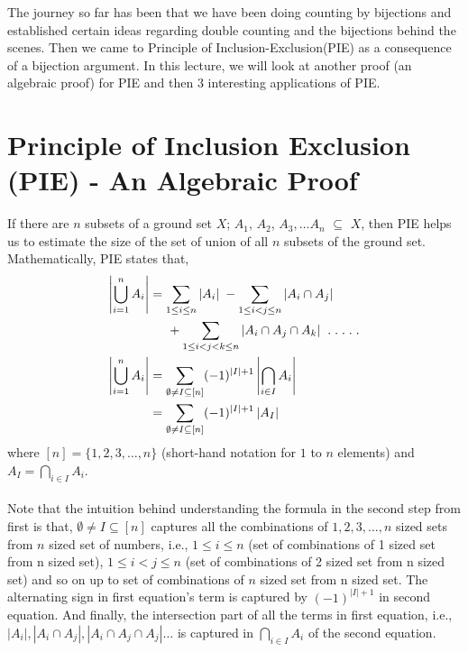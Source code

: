 
The journey so far has been that we have been doing counting by bijections and established certain ideas regarding double counting and the bijections behind the scenes. Then we came to Principle of Inclusion-Exclusion(PIE) as a consequence of a bijection argument. In this lecture, we will look at another proof (an algebraic proof) for PIE and then 3 interesting applications of PIE.

\section{Principle of Inclusion Exclusion (PIE) - An Algebraic Proof} \label{sec:Principle of Inclusion - Exclusion(PIE)}
If there are $n$ subsets of a ground set $X$; $A_1$, $A_2$, $A_3, \ldots A_n$ $\subseteq$ $X$, then PIE helps us to estimate the size of the set of union of all $n$ subsets of the ground set. Mathematically, PIE states that,
\begin{align*}
\left|\bigcup_{i=1}^{n} A_i\right| &= \sum_{1 \le i \le n} | A_i|
\hspace{0.1cm}- \sum_{1 \le i < j \le n} \left| A_i \cap A_j \right| \\
&\hspace{0.5cm}+ \sum_{1 \le i < j < k \le n} | A_i \cap A_j \cap A_k| \hspace{0.2cm}.\hspace{0.1cm}.\hspace{0.1cm}.\hspace{0.1cm}.\hspace{0.1cm}.\\
\left|\bigcup_{i=1}^{n} A_i\right| &= \sum_{\emptyset \neq I \subseteq [n]} (-1)^{|I| +1} \left|\bigcap_{i \in I} A_i \right|\\
&=\sum_{\emptyset \neq I \subseteq [n]} (-1)^{|I| +1} \left|A_I\right|
\end{align*}
where $[n] = \{1,2,3, \ldots, n\} $ (short-hand notation for $1$ to $n$ elements) and $A_I = \bigcap_{i \in I} A_i$.\\
\\
Note that the intuition behind understanding the formula in the second step from first is that, $ \emptyset \neq I \subseteq [n]$ captures all the combinations of $1,2,3, \ldots ,n$ sized sets from $n$ sized set of numbers, i.e., $1 \le i \le n$ (set of combinations of 1 sized set from n sized set), $1 \le i < j \le n$ (set of combinations of 2 sized set from n sized set) and so on up to set of combinations of $n$ sized set from n sized set. The alternating sign in first equation's term is captured by $(-1)^{|I| +1}$ in second equation. And finally, the intersection part of all the terms in first equation, i.e., $|A_i|, |A_i \cap A_j|,  |A_i \cap A_j \cap A_j| \ldots$ is captured in $ \bigcap_{i \in I} A_i$ of the second equation.
